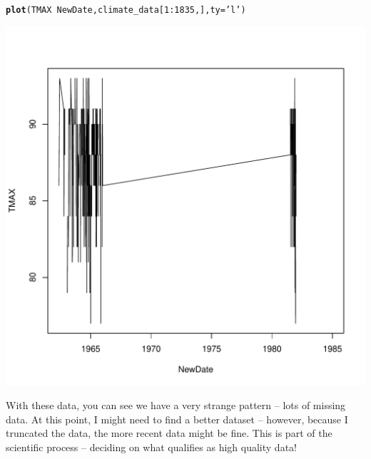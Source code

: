 \documentclass{article}\usepackage[]{graphicx}\usepackage[]{color}
\makeatletter
\def\maxwidth{ %
  \ifdim\Gin@nat@width>\linewidth
    \linewidth
  \else
    \Gin@nat@width
  \fi
}
\newcommand{\hlnum}[1]{\textcolor[rgb]{0.686,0.059,0.569}{#1}}%
\newcommand{\hlstr}[1]{\textcolor[rgb]{0.192,0.494,0.8}{#1}}%
\newcommand{\hlopt}[1]{\textcolor[rgb]{0,0,0}{#1}}%
\newcommand{\hlstd}[1]{\textcolor[rgb]{0.345,0.345,0.345}{#1}}%
\newcommand{\hlkwc}[1]{\textcolor[rgb]{0.333,0.667,0.333}{#1}}%
\newcommand{\hlkwd}[1]{\textcolor[rgb]{0.737,0.353,0.396}{\textbf{#1}}}%
\newenvironment{kframe}{%
 \def\at@end@of@kframe{}%
 \ifinner\ifhmode%
  \def\at@end@of@kframe{\end{minipage}}%
  \begin{minipage}{\columnwidth}%
 \fi\fi%
 \def\FrameCommand##1{\hskip\@totalleftmargin \hskip-\fboxsep
 \colorbox{shadecolor}{##1}\hskip-\fboxsep
     \hskip-\linewidth \hskip-\@totalleftmargin \hskip\columnwidth}%
 \MakeFramed {\advance\hsize-\width
   \@totalleftmargin\z@ \linewidth\hsize
   \@setminipage}}%
 {\par\unskip\endMakeFramed%
 \at@end@of@kframe}
\newenvironment{knitrout}{}{} %
\makeatother
\begin{document}
\begin{knitrout}
\color{fgcolor}\begin{kframe}
\begin{alltt}
\hlkwd{plot}\hlstd{(TMAX}\hlopt{~}\hlstd{NewDate, climate_data[}\hlnum{1}\hlopt{:}\hlnum{1835}\hlstd{,],} \hlkwc{ty}\hlstd{=}\hlstr{'l'}\hlstd{)}
\end{alltt}
\end{kframe}
\includegraphics[width=\maxwidth]{figure/unnamed-chunk-14-1} 

\end{knitrout}


With these data, you can see we have a very strange pattern -- lots of missing data. At this point, I might need to find a better dataset -- however, because I truncated the data, the more recent data might be fine. This is part of the scientific process -- deciding on what qualifies as high quality data!


\end{document}
